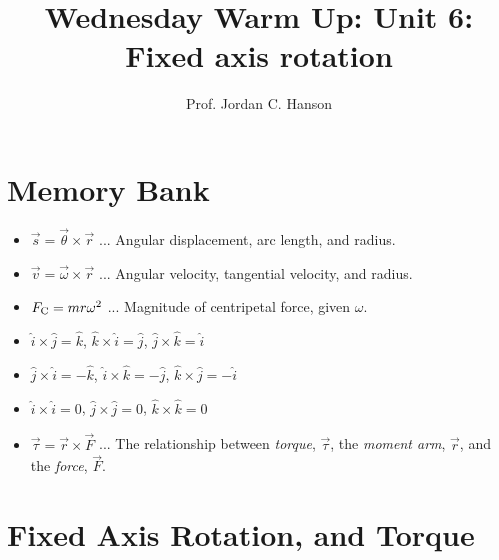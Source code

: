\documentclass{article}
\begin{document}
\twocolumn

\title{Wednesday Warm Up: Unit 6: Fixed axis rotation}
\author{Prof. Jordan C. Hanson}

\maketitle

\section{Memory Bank}

\begin{itemize}
\item $\vec{s} = \vec{\theta} \times \vec{r}$ ... Angular displacement, arc length, and radius.
\item $\vec{v} = \vec{\omega} \times \vec{r}$ ... Angular velocity, tangential velocity,  and radius.
\item $F_{\rm C} = mr\omega^2$ ... Magnitude of centripetal force, given $\omega$.
\item $\hat{i} \times \hat{j} = \hat{k}$, $\hat{k} \times \hat{i} = \hat{j}$, $\hat{j} \times \hat{k} = \hat{i}$
\item $\hat{j} \times \hat{i} = -\hat{k}$, $\hat{i} \times \hat{k} = -\hat{j}$, $\hat{k} \times \hat{j} = -\hat{i}$
\item $\hat{i} \times \hat{i} = 0$, $\hat{j} \times \hat{j} = 0$, $\hat{k} \times \hat{k} = 0$
\item $\vec{\tau} = \vec{r} \times \vec{F}$ ... The relationship between \textit{torque}, $\vec{\tau}$, the \textit{moment arm}, $\vec{r}$, and the \textit{force}, $\vec{F}$.
\end{itemize}

\section{Fixed Axis Rotation, and Torque}
\end{document}
